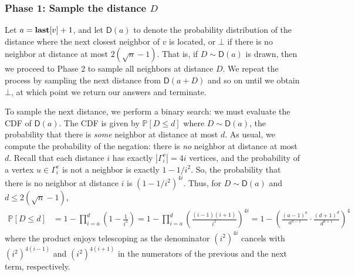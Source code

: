 \subsubsection{Phase 1: Sample the distance $D$}
Let $a = \mathbf{last}[v] + 1$, and let $\mathsf{D}(a)$ to denote the probability distribution of the distance where the next closest neighbor of $v$ is located, or $\bot$ if there is no neighbor at distance at most $2(\sqrt{n}-1)$.
That is, if $D\sim\mathsf{D}(a)$ is drawn, then we proceed to Phase 2 to sample all neighbors at distance $D$.
We repeat the process by sampling the next distance from $\mathsf{D}(a+D)$ and so on until we obtain $\bot$, at which point we return our answers and terminate.

To sample the next distance, we perform a binary search: we must evaluate the CDF of $\mathsf{D}(a)$.
The CDF is given by $\mathbb P[D\leq d]$ where $D\sim\mathsf{D}(a)$, the probability that there is \emph{some} neighbor at distance at most $d$.
As usual, we compute the probability of the negation: there is \emph{no} neighbor at distance at most $d$.
Recall that each distance $i$ has exactly $|\Gamma_i^v| = 4i$ vertices, and the probability of a vertex $u \in \Gamma_i^v$ is not a neighbor is exactly $1-1/i^2$.
So, the probability that there is no neighbor at distance $i$ is $(1-1/i^2)^{4i}$.
Thus, for $D\sim\mathsf{D}(a)$ and $d \leq 2(\sqrt{n}-1)$,
\begin{align*}
\mathbb P[D\leq d] &= 1-\prod_{i=a}^{d} \left(1-\frac{1}{i^2}\right) = 1-\prod_{i=a}^{d} \left(\frac{(i-1)(i+1)}{i^2}\right)^{4i}
=1-\left(\frac{(a-1)^{a}}{a^{a-1}}\cdot\frac{(d+1)^{d}}{d^{d+1}}\right)^4
\end{align*}
where the product enjoys telescoping as the denominator $(i^2)^{4i}$ cancels with $(i^2)^{4(i-1)}$ and $(i^2)^{4(i+1)}$ in the numerators of the previous and the next term, respectively.
\iffalse
